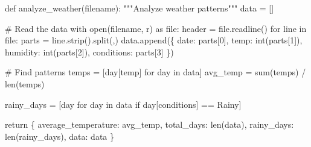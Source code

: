 \documentclass[
  letterpaper,
  DIV=11,
  numbers=noendperiod,
  oneside]{scrreprt}
\newenvironment{Shaded}{}{}
\newcommand{\BuiltInTok}[1]{\textcolor[rgb]{0.84,0.23,0.29}{#1}}
\newcommand{\CommentTok}[1]{\textcolor[rgb]{0.42,0.45,0.49}{#1}}
\newcommand{\ControlFlowTok}[1]{\textcolor[rgb]{0.84,0.23,0.29}{#1}}
\newcommand{\DecValTok}[1]{\textcolor[rgb]{0.00,0.36,0.77}{#1}}
\newcommand{\ImportTok}[1]{\textcolor[rgb]{0.01,0.18,0.38}{#1}}
\newcommand{\KeywordTok}[1]{\textcolor[rgb]{0.84,0.23,0.29}{#1}}
\newcommand{\NormalTok}[1]{\textcolor[rgb]{0.14,0.16,0.18}{#1}}
\newcommand{\OperatorTok}[1]{\textcolor[rgb]{0.14,0.16,0.18}{#1}}
\newcommand{\StringTok}[1]{\textcolor[rgb]{0.01,0.18,0.38}{#1}}
\begin{document}
\begin{Shaded}
\begin{Highlighting}[]
\KeywordTok{def}\NormalTok{ analyze\_weather(filename):}
    \CommentTok{"""Analyze weather patterns"""}
\NormalTok{    data }\OperatorTok{=}\NormalTok{ []}
    
    \CommentTok{\# Read the data}
    \ControlFlowTok{with} \BuiltInTok{open}\NormalTok{(filename, }\StringTok{\textquotesingle{}r\textquotesingle{}}\NormalTok{) }\ImportTok{as} \BuiltInTok{file}\NormalTok{:}
\NormalTok{        header }\OperatorTok{=} \BuiltInTok{file}\NormalTok{.readline()}
        \ControlFlowTok{for}\NormalTok{ line }\KeywordTok{in} \BuiltInTok{file}\NormalTok{:}
\NormalTok{            parts }\OperatorTok{=}\NormalTok{ line.strip().split(}\StringTok{\textquotesingle{},\textquotesingle{}}\NormalTok{)}
\NormalTok{            data.append(\{}
                \StringTok{\textquotesingle{}date\textquotesingle{}}\NormalTok{: parts[}\DecValTok{0}\NormalTok{],}
                \StringTok{\textquotesingle{}temp\textquotesingle{}}\NormalTok{: }\BuiltInTok{int}\NormalTok{(parts[}\DecValTok{1}\NormalTok{]),}
                \StringTok{\textquotesingle{}humidity\textquotesingle{}}\NormalTok{: }\BuiltInTok{int}\NormalTok{(parts[}\DecValTok{2}\NormalTok{]),}
                \StringTok{\textquotesingle{}conditions\textquotesingle{}}\NormalTok{: parts[}\DecValTok{3}\NormalTok{]}
\NormalTok{            \})}
    
    \CommentTok{\# Find patterns}
\NormalTok{    temps }\OperatorTok{=}\NormalTok{ [day[}\StringTok{\textquotesingle{}temp\textquotesingle{}}\NormalTok{] }\ControlFlowTok{for}\NormalTok{ day }\KeywordTok{in}\NormalTok{ data]}
\NormalTok{    avg\_temp }\OperatorTok{=} \BuiltInTok{sum}\NormalTok{(temps) }\OperatorTok{/} \BuiltInTok{len}\NormalTok{(temps)}
    
\NormalTok{    rainy\_days }\OperatorTok{=}\NormalTok{ [day }\ControlFlowTok{for}\NormalTok{ day }\KeywordTok{in}\NormalTok{ data }\ControlFlowTok{if}\NormalTok{ day[}\StringTok{\textquotesingle{}conditions\textquotesingle{}}\NormalTok{] }\OperatorTok{==} \StringTok{\textquotesingle{}Rainy\textquotesingle{}}\NormalTok{]}
    
    \ControlFlowTok{return}\NormalTok{ \{}
        \StringTok{\textquotesingle{}average\_temperature\textquotesingle{}}\NormalTok{: avg\_temp,}
        \StringTok{\textquotesingle{}total\_days\textquotesingle{}}\NormalTok{: }\BuiltInTok{len}\NormalTok{(data),}
        \StringTok{\textquotesingle{}rainy\_days\textquotesingle{}}\NormalTok{: }\BuiltInTok{len}\NormalTok{(rainy\_days),}
        \StringTok{\textquotesingle{}data\textquotesingle{}}\NormalTok{: data}
\NormalTok{    \}}
\end{Highlighting}
\end{Shaded}
\end{document}
